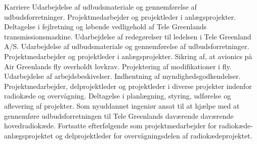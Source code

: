 \begin{rubric}{Karriere}
%
\entry*Udarbejdelse af udbudsmateriale og gennemførelse af udbudsforretninger.
\entry*Projektmedarbejder og projektleder i anlægsprojekter.
\entry*[mar 2014 -] Deltagelse i fejlretning og løbende vedligehold af Tele Greenlands transmissionsmaskine.
%
 Udarbejdelse af redegørelser til ledelsen i Tele Greenland A/S.
\entry*Udarbejdelse af udbudsmateriale og gennemførelse af udbudsforretninger.
\entry*Projektmedarbejder og projektleder i anlægsprojekter.
%
 Sikring af, at avionics på Air Greenlands fly overholdt lovkrav.
\entry*Projektering af modifikationer i fly.
\entry*Udarbejdelse af arbejdsbeskivelser.
\entry*Indhentning af myndighedsgodkendelser.
%
 Projektmedarbejder, delprojektleder og projektleder i diverse projekter indenfor radiokæde og overvågning.
\entry*Deltagelse i planlægning, styring, udførelse og aflevering af projekter.
%
 Som nyuddannet ingeniør ansat til at hjælpe med at gennemføre  udbudsforretningen til Tele Greenlands daværende daværende hovedradiokæde.
\entry*Fortsatte efterfølgende som projektmedarbejder for radiokæde-anlægsprojektet og delprojektleder for overvågningsdelen af radiokædeprojektet.
\end{rubric}
